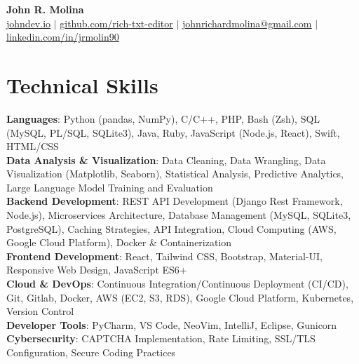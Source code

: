 \documentclass[letterpaper,11pt]{article}
\begin{document}

\begin{center}
    \textbf{\Huge John R. Molina} \\ \vspace{1pt}
    \small \href{https://www.johndev.io}{\underline{johndev.io}} $|$
    \href{https://github.com/rich-txt-editor}{\underline{github.com/rich-txt-editor}} $|$
    \href{mailto:johnrichardmolina@gmail.com}{\underline{johnrichardmolina@gmail.com}} $|$
    \href{https://linkedin.com/in/jrmolin90}{\underline{linkedin.com/in/jrmolin90}}
  \end{center}

\section{Technical Skills}
 \begin{itemize}[leftmargin=0.15in, label={}]
    \small{\item{
     \textbf{Languages}{: Python (pandas, NumPy), C/C++, PHP, Bash (Zsh), SQL (MySQL, PL/SQL, SQLite3), Java, Ruby, JavaScript (Node.js, React), Swift, HTML/CSS} \\
     \textbf{Data Analysis \& Visualization}{: Data Cleaning, Data Wrangling, Data Visualization (Matplotlib, Seaborn), Statistical Analysis, Predictive Analytics, Large Language Model Training and Evaluation} \\
     \textbf{Backend Development}{: REST API Development (Django Rest Framework, Node.js), Microservices Architecture, Database Management (MySQL, SQLite3, PostgreSQL), Caching Strategies, API Integration, Cloud Computing (AWS, Google Cloud Platform), Docker \& Containerization} \\
     \textbf{Frontend Development}{: React, Tailwind CSS, Bootstrap, Material-UI, Responsive Web Design, JavaScript ES6+} \\
     \textbf{Cloud \& DevOps}{: Continuous Integration/Continuous Deployment (CI/CD), Git, Gitlab, Docker, AWS (EC2, S3, RDS), Google Cloud Platform, Kubernetes, Version Control} \\
     \textbf{Developer Tools}{: PyCharm, VS Code, NeoVim, IntelliJ, Eclipse, Gunicorn} \\
     \textbf{Cybersecurity}{: CAPTCHA Implementation, Rate Limiting, SSL/TLS Configuration, Secure Coding Practices} \\
    }}
 \end{itemize}
\end{document}
